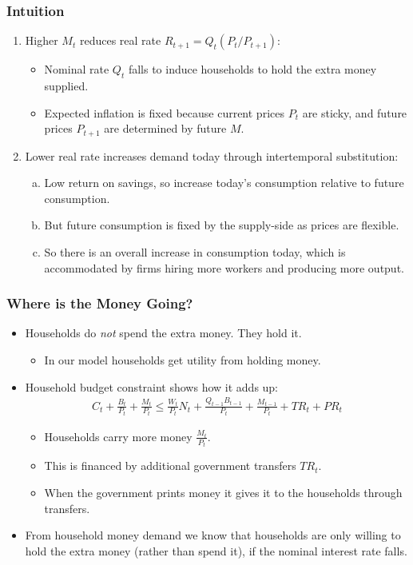 \documentclass[english,xcolor=svgnames]{beamer}
\begin{document}
\begin{frame}
\frametitle{Intuition
}
\begin{enumerate}[1.]
	\item Higher $M_t$ reduces real rate $R_{t+1}=Q_t (P_t/P_{t+1})$:
	\begin{itemize}
		\item Nominal rate $Q_t$ falls to induce households to hold the extra money supplied.
		\item Expected inflation is fixed because current prices $P_t$ are sticky, and future prices $P_{t+1}$ are determined by future $M$.
	\end{itemize}
	\item Lower real rate increases demand today through intertemporal substitution:
	\begin{enumerate}[(a)]
		\item Low return on savings, so increase today's consumption relative to future consumption.
		\item But future consumption is fixed by the supply-side as prices are flexible.
		\item So there is an overall increase in consumption today, which is accommodated by firms hiring more workers and producing more output.
	\end{enumerate}
\end{enumerate}
\end{frame}


\begin{frame}
	\frametitle{Where is the Money Going?
	}
	\begin{itemize}
		\item Households do \emph{not} spend the extra money. They hold it.
		\begin{itemize}
			\item In our model households get utility from holding money.
		\end{itemize}
		\item Household budget constraint shows how it adds up:
		\begin{align*}
			C_t + \frac{B_{t}}{P_t}  + \frac{M_t}{P_t}  \le \frac{W_t}{P_t} N_t +  \frac{Q_{t-1}B_{t-1}}{P_t} + \frac{M_{t-1}}{P_t} + TR_t+PR_t
		\end{align*}
		\begin{itemize}
			\item Households carry more money $\frac{M_t}{P_t}$.
			\item This is financed by additional government transfers $TR_t$.
			\item When the government prints money it gives it to the households through transfers.
		\end{itemize}
		\item From household money demand we know that households are only willing to hold the extra money (rather than spend it), if the nominal interest rate falls.
	\end{itemize}
\end{frame}
\end{document}
